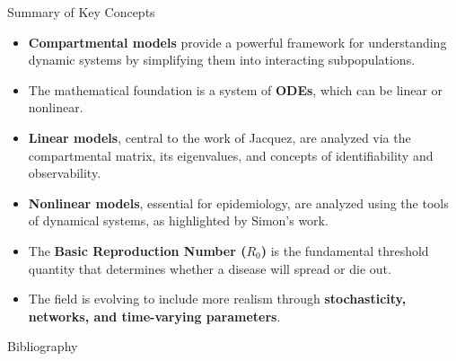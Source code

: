 \documentclass[aspectratio=169]{beamer}\usepackage[]{graphicx}\usepackage[]{xcolor}
\begin{document}
\begin{frame}{Summary of Key Concepts}
    \begin{itemize}
        \item \textbf{Compartmental models} provide a powerful framework for understanding dynamic systems by simplifying them into interacting subpopulations.
        \item The mathematical foundation is a system of \textbf{ODEs}, which can be linear or nonlinear.
        \item \textbf{Linear models}, central to the work of Jacquez, are analyzed via the compartmental matrix, its eigenvalues, and concepts of identifiability and observability.
        \item \textbf{Nonlinear models}, essential for epidemiology, are analyzed using the tools of dynamical systems, as highlighted by Simon's work.
        \item The \textbf{Basic Reproduction Number ($R_0$)} is the fundamental threshold quantity that determines whether a disease will spread or die out.
        \item The field is evolving to include more realism through \textbf{stochasticity, networks, and time-varying parameters}.
    \end{itemize}
\end{frame}

\begin{frame}[allowframebreaks]{Bibliography}


\end{frame}
\end{document}
